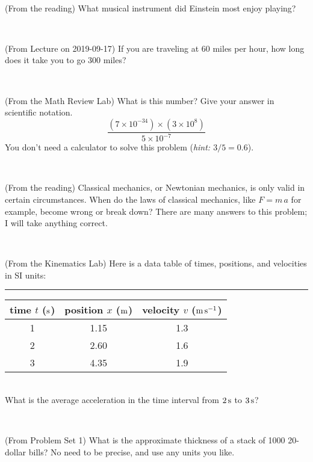 \documentclass[12pt, letterpaper]{article}
\begin{document}
\vfill ~

\begin{problem} (From the reading)
What musical instrument did Einstein most enjoy playing?
\end{problem}


\vfill ~

\begin{problem} (From Lecture on 2019-09-17)
If you are traveling at 60 miles per hour, how long does
it take you to go 300 miles?
\end{problem}


\vfill ~


\clearpage


\begin{problem} (From the Math Review Lab)
What is this number? Give your answer in scientific notation.
$$
\frac{(7\times10^{-34})\times(3\times10^8)}{5\times10^{-7}}
$$
You don't need a calculator to solve this problem (\textit{hint: $3/5=0.6$}).
\end{problem}


\vfill ~

\begin{problem} (From the reading)
Classical mechanics, or Newtonian mechanics, is only valid in certain
circumstances. When do the laws of classical mechanics, like $F =
m\,a$ for example, become wrong or break down? There are many answers
to this problem; I will take anything correct.
\end{problem}


\vfill ~

\begin{problem} (From the Kinematics Lab)
Here is a data table of times, positions, and velocities in SI units:\\
\rule{1.0in}{0pt}\begin{tabular}{c|c|c}
time $t$ ($\mathrm{s}$) & position $x$ ($\mathrm{m}$) & velocity $v$ ($\mathrm{m}\,\mathrm{s}^{-1}$) \\
\hline
1 & 1.15 & 1.3 \\
2 & 2.60 & 1.6 \\
3 & 4.35 & 1.9 \\
\hline
\end{tabular}\\
What is the average acceleration in the time interval from $2\,\mathrm{s}$ to $3\,\mathrm{s}$?
\end{problem}


\vfill ~

\begin{problem} (From Problem Set 1)
What is the approximate thickness of a stack of 1000 20-dollar bills?
No need to be precise, and use any units you like.
\end{problem}
\end{document}
